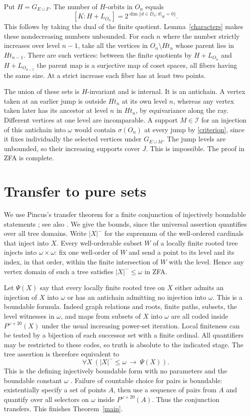 \documentclass[11pt]{article}
\newcommand{\II}{\mathcal I}
\begin{document}
Put $H=G_{E\cup F}$. The number of $H$-orbits in $O_n$ equals
\[
 [K:H+L_{O_n}]=2^{\dim\{d\in D_n:d|_H=0\}}.
\]
This follows by taking the dual of the finite quotient. Lemma~\ref{characters} makes these nondecreasing numbers unbounded. For each $n$ where the number strictly increases over level $n-1$, take all the vertices in $O_n\setminus Ht_n$ whose parent lies in $Ht_{n-1}$. There are such vertices: between the finite quotients by $H+L_{O_n}$ and $H+L_{O_{n-1}}$ the parent map is a surjective map of coset spaces, all fibers having the same size. At a strict increase each fiber has at least two points.

The union of these sets is $H$-invariant and is internal. It is an antichain. A vertex taken at an earlier jump is outside $Ht_n$ at its own level $n$, whereas any vertex taken later has its ancestor at level $n$ in $Ht_n$, by equivariance along the ray. Different vertices at one level are incomparable. A support $M\in\II$ for an injection of this antichain into $\omega$ would contain $\sigma(O_n)$ at every jump by \eqref{criterion}, since it fixes individually the selected vertices under $G_{E\cup M}$. The jump levels are unbounded, so their increasing supports cover $J$. This is impossible. The proof in ZFA is complete.

\section{Transfer to pure sets}
We use Pincus's transfer theorem for a finite conjunction of injectively boundable statements \cite[Theorem~3A3]{pincus}; see also \cite[Theorem~2.6]{bg}. We give the bounds, since the universal assertion quantifies over all tree domains. Write $|X|^-$ for the supremum of the well-ordered cardinals that inject into $X$. Every well-orderable subset $W$ of a locally finite rooted tree injects into $\omega\times\omega$: fix one well-order of $W$ and send a point to its level and its index, in that order, within the finite intersection of $W$ with the level. Hence any vertex domain of such a tree satisfies $|X|^-\le\omega$ in ZFA.

Let $\Psi(X)$ say that every locally finite rooted tree on $X$ either admits an injection of $X$ into $\omega$ or has an antichain admitting no injection into $\omega$. This is a boundable formula. Indeed graph relations and roots, finite paths, subsets, the level witnesses in $\omega$, and maps from subsets of $X$ into $\omega$ are all coded inside $P^{\omega+20}(X)$ under the usual increasing power-set iteration. Local finiteness can be tested by a bijection of each successor set with a finite ordinal. All quantifiers may be restricted to these codes, so truth is absolute to the indicated stage. The tree assertion is therefore equivalent to
\[
  \forall X\ (|X|^-\le\omega\ \longrightarrow\ \Psi(X)).
\]
This is the defining injectively boundable form with no parameters and the boundable constant $\omega$ \cite[Section~5]{mad}. Failure of countable choice for pairs is boundable: existentially specify a set of points $A$, then use a sequence of pairs from $A$ and quantify over all selectors on $\omega$ inside $P^{\omega+20}(A)$. Thus the conjunction transfers. This finishes Theorem~\ref{main}.
\end{document}

